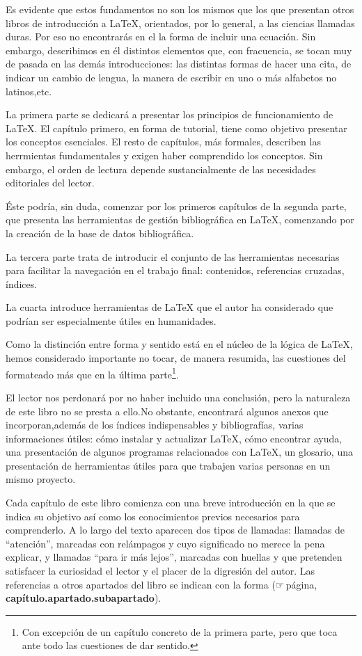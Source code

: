 Es evidente que estos fundamentos no son los mismos que los que presentan otros libros de introducción a \LaTeX{}, orientados, por lo general, a las ciencias llamadas duras. Por eso no encontrarás en el la forma de incluir una ecuación. Sin embargo, describimos en él distintos elementos que, con fracuencia, se tocan muy de pasada en las demás introducciones: las distintas formas de hacer una cita, de indicar un cambio de lengua, la manera de escribir en uno o más alfabetos no latinos,etc.

La primera parte se dedicará a presentar los principios de funcionamiento de \LaTeX. El capítulo primero, en forma de tutorial, tiene como objetivo presentar los conceptos esenciales. El resto de capítulos, más formales, describen las herrmientas fundamentales y exigen haber comprendido los conceptos. Sin embargo, el orden de lectura depende sustancialmente de las necesidades editoriales del lector. 

Éste podría, sin duda, comenzar por los primeros capítulos de la segunda parte, que presenta las herramientas de gestión bibliográfica en \LaTeX{}, comenzando por la creación de la base de datos bibliográfica.

La tercera parte trata de introducir el conjunto de las herramientas necesarias para facilitar la navegación en el trabajo final: contenidos, referencias cruzadas, índices.

La cuarta introduce herramientas de \LaTeX{} que el autor ha considerado que podrían ser especialmente útiles en humanidades.

Como la distinción entre forma y sentido está en el núcleo de la lógica de  \LaTeX{}, hemos considerado importante no tocar, de manera resumida, las cuestiones del formateado más que en la última parte\footnote{Con excepción de un capítulo concreto de la primera parte, pero que toca ante todo las cuestiones de dar sentido.}.

El lector nos perdonará por no haber incluido una conclusión, pero la naturaleza de este libro no se presta a ello.No obstante, encontrará algunos anexos que incorporan,además de los índices indispensables y bibliografías, varias informaciones útiles:  cómo instalar y actualizar \LaTeX{}, cómo encontrar ayuda, una presentación de algunos programas relacionados con \LaTeX{}, un glosario, una presentación de herramientas útiles para que trabajen varias personas en un mismo proyecto.

Cada capítulo de este libro comienza con una breve introducción en la que se indica su objetivo así como los conocimientos previos necesarios para comprenderlo. A lo largo del texto aparecen dos tipos de llamadas: llamadas de \enquote{atención}, marcadas con relámpagos y cuyo significado no merece la pena explicar, y llamadas \enquote{para ir más lejos}, marcadas con huellas y que pretenden satisfacer la curiosidad el lector y el placer de la digresión del autor. Las referencias a otros apartados del libro se indican con la forma (☞\,página, \textbf{capítulo.apartado.subapartado}).

